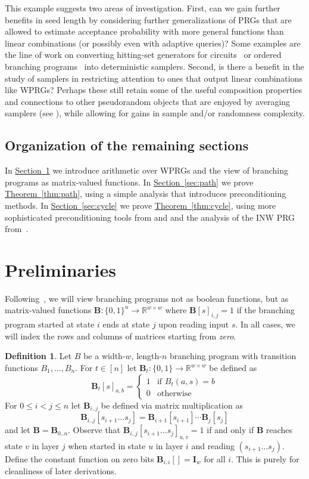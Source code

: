 \documentclass[11pt]{article}
\numberwithin{equation}{section}
\theoremstyle{definition}
\newtheorem{definition}[theorem]{Definition}
\theoremstyle{plain}
\newcommand{\R}{\mathbb R}
\newcommand{\expref}[2]{\hyperref[#2]{#1~\ref{#2}}}
\newcommand{\zo}{\{0,1\}}
\newcommand{\ra}{\rightarrow}
\newcommand{\I}{\mathbf{I}}
\newcommand{\bp}{{\mathbf{B}}}
\begin{document}
This example suggests two areas of investigation.  First, can we gain further benefits in seed length by considering further generalizations of PRGs that are allowed to estimate acceptance probability with more general functions than linear combinations (or possibly even with adaptive queries)?  Some examples are the
line of work on converting hitting-set generators for circuits~\cite{AndreevClRo98,AndreevClRoTr99,BuhrmanFo99,GoldreichVaWi11} or ordered branching programs~\cite{ChengHo20} into deterministic samplers.
Second, is there a benefit in the study of samplers in restricting attention to ones that output linear combinations like WPRGs?  Perhaps these still %
retain  %
some of the useful composition properties and connections to other pseudorandom objects that are enjoyed by averaging samplers %
(see  %
\cite{Zuckerman97,vadhan2012pseudorandomness,Agrawal19}), while allowing for gains in sample and/or randomness complexity.

\subsection{Organization of the remaining sections}
In \expref{Section}{sec:prelim} we introduce arithmetic over WPRGs and the view of branching programs as %
matrix-valued  %
functions. In \expref{Section}{sec:path} we prove \expref{Theorem}{thm:path}, using a simple analysis that introduces preconditioning methods. In \expref{Section}{sec:cycle} we prove \expref{Theorem}{thm:cycle}, using more sophisticated preconditioning tools from \cite{AhmadinejadKeMuPeSiVa19} and \cite{CKPPRSV17} and the analysis of the INW PRG from~\cite{HozaPyVa21}.

\section{Preliminaries}\label{sec:prelim}
Following~\cite{ReingoldStVa13}, we will view branching programs not as boolean functions, but as matrix-valued functions $\bp:\zo^n\ra\R^{w\times w}$ where $\bp[s]_{i,j}=1$ if the branching program started at state $i$ ends at state $j$ upon reading input $s$. In all cases, we will index the rows and columns of matrices starting from \emph{zero}.

\begin{definition}
Let $B$ be a width-$w$, length-$n$ branching program with transition functions $B_1,\ldots,B_n$. For $t\in [n]$ let $\bp_t:\zo\ra \R^{w\times w}$ be defined as
\[\bp_t[s]_{a,b} = \begin{cases}   
1 & \text{if } B_t(a,s)=b\\
0 & \text{otherwise}
\end{cases}\]
For $0\leq i<j\leq n$ let $\bp_{i..j}$ be defined via matrix multiplication as 
\[\bp_{i..j}[s_{i+1}\dots s_{j}]=\bp_{i+1}[s_{i+1}]\cdots\bp_j[s_j]\]
and let $\bp=\bp_{0..n}$. Observe that $\bp_{i..j}[s_{i+1}\dots s_j]_{u,v}=1$ if and only if $\bp$ reaches state $v$ in layer $j$ when started in state $u$ in layer $i$ and reading $(s_{i+1}\dots s_j)$. Define the constant function on zero bits $\bp_{i,i}[]=\I_w$ for all $i$. This is purely for cleanliness of later derivations.
\end{definition}
\end{document}
